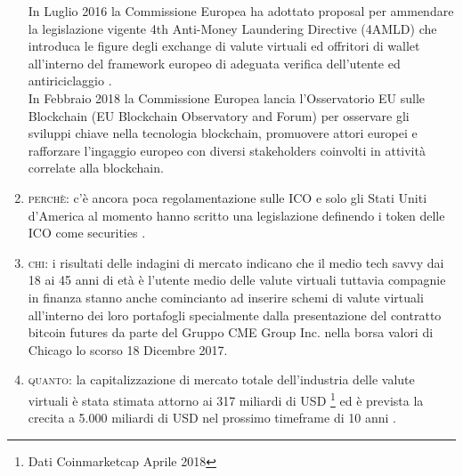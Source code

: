 \documentclass[11pt,fleqn,oneside]{book} %
\begin{document}
\begin{enumerate}
	In Luglio 2016 la Commissione Europea ha adottato proposal per ammendare la legislazione vigente 4th Anti-Money Laundering Directive (4AMLD) 
	che introduca le figure degli exchange di valute virtuali ed offritori di wallet all'interno del framework europeo di adeguata verifica
	dell'utente ed antiriciclaggio \cite{EUAMLCrypto}.\\
	In Febbraio 2018 la Commissione Europea lancia l'Osservatorio EU sulle Blockchain (EU Blockchain Observatory and Forum) \cite{EUBOaF} 
	per osservare gli sviluppi chiave nella tecnologia blockchain, promuovere attori europei e rafforzare l'ingaggio europeo con
	diversi stakeholders coinvolti in attività correlate alla blockchain.
	\item \textsc{perchè}: c'è ancora poca regolamentazione sulle ICO e solo gli Stati Uniti d'America al momento
	hanno scritto una legislazione definendo i token delle ICO come securities \cite{SECICO}.
	\item \textsc{chi}: i risultati delle indagini di mercato indicano che il medio tech savvy dai 18 ai 45 anni di età è
	l'utente medio delle valute virtuali tuttavia compagnie in finanza stanno anche comincianto ad inserire schemi di 
	valute virtuali all'interno dei loro portafogli specialmente dalla presentazione del contratto bitcoin futures 
	da parte del Gruppo CME Group Inc. nella borsa valori di Chicago lo scorso 18 Dicembre 2017.
	\item \textsc{quanto}: la capitalizzazione di mercato totale dell'industria delle valute virtuali è stata stimata attorno
	ai 317 miliardi di USD \footnote{Dati Coinmarketcap Aprile 2018}
	ed è prevista la crecita a 5.000 miliardi di USD nel prossimo timeframe di 10 anni \cite{cryptoMCTenYears}.



\end{enumerate}
\end{document}
